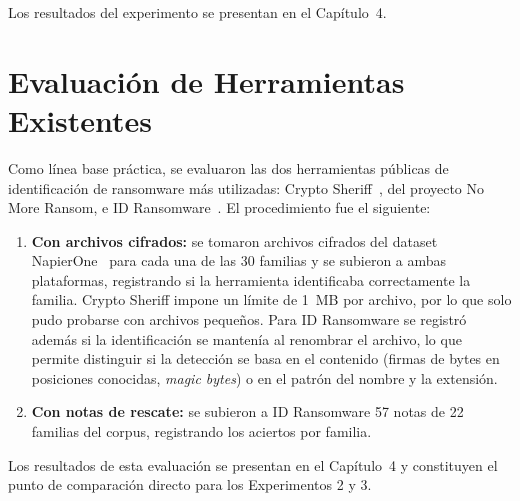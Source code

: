 Los resultados del experimento se presentan en el Capítulo~4.

\section{Evaluación de Herramientas Existentes}
\label{sec:met_herramientas}

Como línea base práctica, se evaluaron las dos herramientas públicas de identificación de ransomware más utilizadas: Crypto Sheriff~\cite{cryptosheriff}, del proyecto No More Ransom, e ID Ransomware~\cite{idransomware}. El procedimiento fue el siguiente:

\begin{enumerate}
\item \textbf{Con archivos cifrados:} se tomaron archivos cifrados del dataset NapierOne~\cite{paper_7_napierone} para cada una de las 30 familias y se subieron a ambas plataformas, registrando si la herramienta identificaba correctamente la familia. Crypto Sheriff impone un límite de 1~MB por archivo, por lo que solo pudo probarse con archivos pequeños. Para ID Ransomware se registró además si la identificación se mantenía al renombrar el archivo, lo que permite distinguir si la detección se basa en el contenido (firmas de bytes en posiciones conocidas, \textit{magic bytes}) o en el patrón del nombre y la extensión.
\item \textbf{Con notas de rescate:} se subieron a ID Ransomware 57 notas de 22 familias del corpus, registrando los aciertos por familia.
\end{enumerate}

Los resultados de esta evaluación se presentan en el Capítulo~4 y constituyen el punto de comparación directo para los Experimentos 2 y 3.
